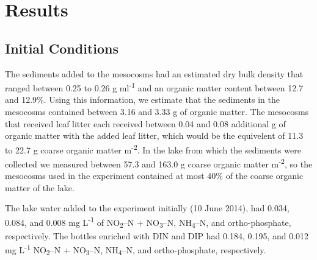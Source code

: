 \section{Results}
\subsection{Initial Conditions}
The sediments added to the mesocosms had an estimated dry bulk density that ranged between 0.25 to 0.26 g ml\textsuperscript{-1} and an organic matter content between 12.7 and 12.9\%. Using this information, we estimate that the sediments in the mesocosms contained between 3.16 and 3.33 g of organic matter.  The mesocosms that received leaf litter each received between 0.04 and 0.08 additional g of organic matter with the added leaf litter, which would be the equivelent of 11.3 to 22.7 g coarse organic matter m\textsuperscript{-2}. In the lake from which the sediments were collected we measured between 57.3 and 163.0 g coarse organic matter m\textsuperscript{-2}, so the mesocosms used in the experiment contained at most 40\% of the coarse organic matter of the lake.

The lake water added to the experiment initially (10 June 2014), had 0.034, 0.084, and 0.008 mg L\textsuperscript{-1} of NO\textsubscript{2}--N + NO\textsubscript{3}--N, NH\textsubscript{4}--N, and ortho-phosphate, respectively. The bottles enriched with DIN and DIP had 0.184, 0.195, and 0.012 mg L\textsuperscript{-1} NO\textsubscript{2}--N + NO\textsubscript{3}--N, NH\textsubscript{4}--N, and ortho-phosphate, respectively.



    